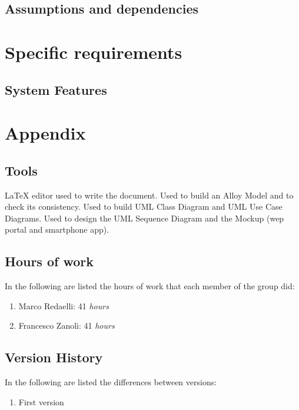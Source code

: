 \documentclass{../Common/Structure/doc_pdf}
\begin{document}
\section{Assumptions and dependencies}


\chapter{Specific requirements}


\section{System Features}




\appendix
\chapter{Appendix}

\section{Tools}
\begin{itemize}
	 \LaTeX{} editor used to write the document.
	 Used to build an Alloy Model and to check its consistency.
	 Used to build UML Class Diagram and UML Use Case Diagrams.
	 Used to design the UML Sequence Diagram and the Mockup (wep portal and smartphone app).

\end{itemize}
\newpage
\section{Hours of work}
In the following are listed the hours of work that each member of the group did:
\begin{enumerate}
	\item Marco Redaelli: 41 \emph{hours}
	\item Francesco Zanoli: 41 \emph{hours}
\end{enumerate}
\newpage
\section{Version History}
In the following are listed the differences between versions:
\begin{enumerate}
	\item First version
\end{enumerate}
\end{document}
